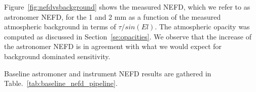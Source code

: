 
 Figure~\ref{fig:nefdvsbackground} shows the
 measured NEFD, which we refer to as astronomer NEFD, for the 1 and 2 mm as a
 function of the measured atmospheric background in terms of $\tau/sin(El)$. The
 atmospheric opacity was computed as discussed in Section~\ref{se:opacities}. We
 observe that the increase of the astronomer NEFD is in agreement with what we
 would expect for background dominated sensitivity.

Baseline astromoner and instrument NEFD results are gathered in
Table.~\ref{tab:baseline_nefd_pipeline}.

